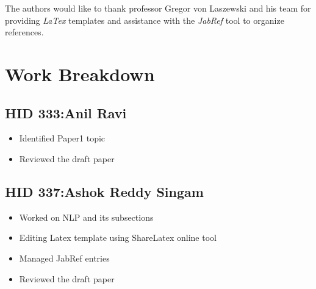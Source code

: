 \documentclass[sigconf]{acmart}
\begin{document}
\begin{acks}

  The authors would like to thank professor Gregor von Laszewski and his team for providing \textit{LaTex} templates and assistance with the \textit{JabRef} tool to organize references.


\end{acks}


 
\newpage
\appendix
\section{Work Breakdown}
\subsection{HID 333:Anil Ravi}
\begin{itemize}
  \item Identified Paper1 topic
  \item Reviewed the draft paper
\end{itemize}
\subsection{HID 337:Ashok Reddy Singam}
\begin{itemize}
  \item Worked on NLP and its subsections
  \item Editing Latex template using ShareLatex online tool
  \item Managed JabRef entries 
  \item Reviewed the draft paper 
\end{itemize}
\end{document}
